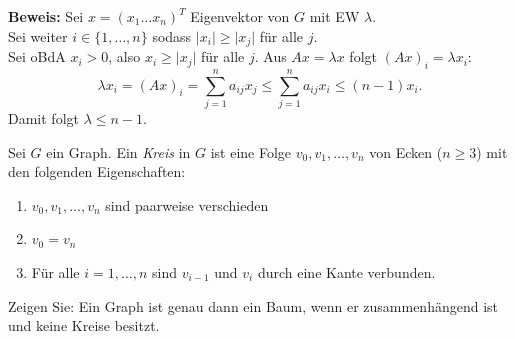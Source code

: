 \begin{solution}
\begin{enumerate}[label=(\alph*)]
      \textbf{Beweis:} Sei \( x = {(x_1 \dots x_n)}^{T} \) Eigenvektor von \( G \) mit EW \( \lambda \). \\
      Sei weiter \( i \in \{ 1, \dots, n \} \) sodass \( \vert x_i \vert \geq \vert x_j \vert \) für alle \( j \). \\
      Sei oBdA \( x_i > 0 \), also \( x_i \geq \vert x_j \vert \) für alle \( j \).
      Aus \( Ax = \lambda x \) folgt \( {(Ax)}_i = \lambda x_i \):
      \begin{equation*}
        \lambda x_i = {(Ax)}_i = \sum_{j=1}^{n} a_{ij}x_j \leq \sum_{j=1}^{n} a_{ij}x_i \leq (n-1)x_i.
      \end{equation*}
      Damit folgt \( \lambda \leq n-1 \).
  \end{enumerate} 
\end{solution}
\begin{assignment}
 Sei $ G $ ein Graph. Ein \emph{Kreis} in $ G $ ist eine Folge $v_0, v_1, \dots, v_n $ von Ecken ($n \geq 3$) mit den folgenden Eigenschaften:
 \begin{enumerate}
    \item $v_0, v_1, \dots, v_n $ sind paarweise verschieden
    \item $v_0 = v_n $
    \item Für alle $i = 1, \dots, n$ sind $v_{ i-1 }$ und $v_i$ durch eine Kante verbunden.
  \end{enumerate} 
  Zeigen Sie: Ein Graph ist genau dann ein Baum, wenn er zusammenhängend ist und keine Kreise besitzt.
\end{assignment}
